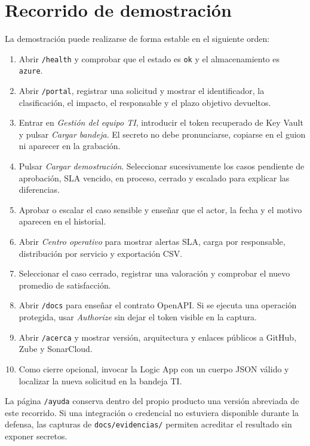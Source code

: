 \FloatBarrier
\section{Recorrido de demostración}

La demostración puede realizarse de forma estable en el siguiente orden:

\begin{enumerate}
    \item Abrir \texttt{/health} y comprobar que el estado es \texttt{ok} y el almacenamiento es \texttt{azure}.
    \item Abrir \texttt{/portal}, registrar una solicitud y mostrar el identificador, la clasificación, el impacto, el responsable y el plazo objetivo devueltos.
    \item Entrar en \textit{Gestión del equipo TI}, introducir el token recuperado de Key Vault y pulsar \textit{Cargar bandeja}. El secreto no debe pronunciarse, copiarse en el guion ni aparecer en la grabación.
    \item Pulsar \textit{Cargar demostración}. Seleccionar sucesivamente los casos pendiente de aprobación, SLA vencido, en proceso, cerrado y escalado para explicar las diferencias.
    \item Aprobar o escalar el caso sensible y enseñar que el actor, la fecha y el motivo aparecen en el historial.
    \item Abrir \textit{Centro operativo} para mostrar alertas SLA, carga por responsable, distribución por servicio y exportación CSV.
    \item Seleccionar el caso cerrado, registrar una valoración y comprobar el nuevo promedio de satisfacción.
    \item Abrir \texttt{/docs} para enseñar el contrato OpenAPI. Si se ejecuta una operación protegida, usar \textit{Authorize} sin dejar el token visible en la captura.
    \item Abrir \texttt{/acerca} y mostrar versión, arquitectura y enlaces públicos a GitHub, Zube y SonarCloud.
    \item Como cierre opcional, invocar la Logic App con un cuerpo JSON válido y localizar la nueva solicitud en la bandeja TI.
\end{enumerate}

La página \texttt{/ayuda} conserva dentro del propio producto una versión abreviada de este recorrido. Si una integración o credencial no estuviera disponible durante la defensa, las capturas de \texttt{docs/evidencias/} permiten acreditar el resultado sin exponer secretos.

